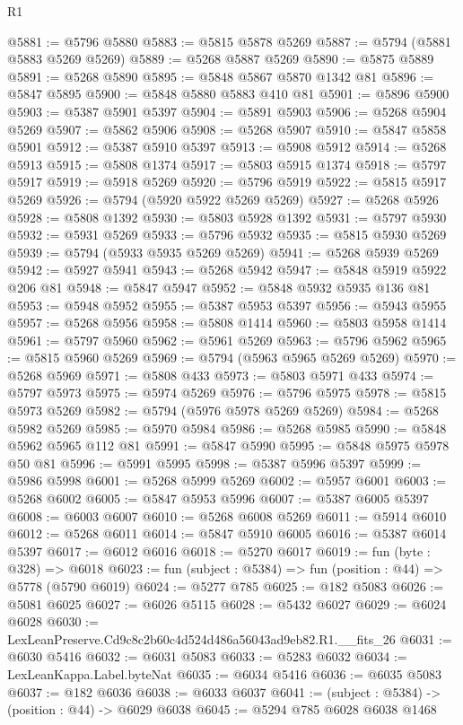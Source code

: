 \begin{lexlean}{R1}
\begin{coremodule}
@5881 := @5796 @5880
@5883 := @5815 @5878 @5269
@5887 := @5794 (@5881 @5883 @5269 @5269)
@5889 := @5268 @5887 @5269
@5890 := @5875 @5889
@5891 := @5268 @5890
@5895 := @5848 @5867 @5870 @1342 @81
@5896 := @5847 @5895
@5900 := @5848 @5880 @5883 @410 @81
@5901 := @5896 @5900
@5903 := @5387 @5901 @5397
@5904 := @5891 @5903
@5906 := @5268 @5904 @5269
@5907 := @5862 @5906
@5908 := @5268 @5907
@5910 := @5847 @5858 @5901
@5912 := @5387 @5910 @5397
@5913 := @5908 @5912
@5914 := @5268 @5913
@5915 := @5808 @1374
@5917 := @5803 @5915 @1374
@5918 := @5797 @5917
@5919 := @5918 @5269
@5920 := @5796 @5919
@5922 := @5815 @5917 @5269
@5926 := @5794 (@5920 @5922 @5269 @5269)
@5927 := @5268 @5926
@5928 := @5808 @1392
@5930 := @5803 @5928 @1392
@5931 := @5797 @5930
@5932 := @5931 @5269
@5933 := @5796 @5932
@5935 := @5815 @5930 @5269
@5939 := @5794 (@5933 @5935 @5269 @5269)
@5941 := @5268 @5939 @5269
@5942 := @5927 @5941
@5943 := @5268 @5942
@5947 := @5848 @5919 @5922 @206 @81
@5948 := @5847 @5947
@5952 := @5848 @5932 @5935 @136 @81
@5953 := @5948 @5952
@5955 := @5387 @5953 @5397
@5956 := @5943 @5955
@5957 := @5268 @5956
@5958 := @5808 @1414
@5960 := @5803 @5958 @1414
@5961 := @5797 @5960
@5962 := @5961 @5269
@5963 := @5796 @5962
@5965 := @5815 @5960 @5269
@5969 := @5794 (@5963 @5965 @5269 @5269)
@5970 := @5268 @5969
@5971 := @5808 @433
@5973 := @5803 @5971 @433
@5974 := @5797 @5973
@5975 := @5974 @5269
@5976 := @5796 @5975
@5978 := @5815 @5973 @5269
@5982 := @5794 (@5976 @5978 @5269 @5269)
@5984 := @5268 @5982 @5269
@5985 := @5970 @5984
@5986 := @5268 @5985
@5990 := @5848 @5962 @5965 @112 @81
@5991 := @5847 @5990
@5995 := @5848 @5975 @5978 @50 @81
@5996 := @5991 @5995
@5998 := @5387 @5996 @5397
@5999 := @5986 @5998
@6001 := @5268 @5999 @5269
@6002 := @5957 @6001
@6003 := @5268 @6002
@6005 := @5847 @5953 @5996
@6007 := @5387 @6005 @5397
@6008 := @6003 @6007
@6010 := @5268 @6008 @5269
@6011 := @5914 @6010
@6012 := @5268 @6011
@6014 := @5847 @5910 @6005
@6016 := @5387 @6014 @5397
@6017 := @6012 @6016
@6018 := @5270 @6017
@6019 := fun (byte : @328) => @6018
@6023 := fun (subject : @5384) => fun (position : @44) => @5778 (@5790 @6019)
@6024 := @5277 @785
@6025 := @182 @5083
@6026 := @5081 @6025
@6027 := @6026 @5115
@6028 := @5432 @6027
@6029 := @6024 @6028
@6030 := LexLeanPreserve.Cd9c8c2b60c4d524d486a56043ad9eb82.R1.__fits_26
@6031 := @6030 @5416
@6032 := @6031 @5083
@6033 := @5283 @6032
@6034 := LexLeanKappa.Label.byteNat
@6035 := @6034 @5416
@6036 := @6035 @5083
@6037 := @182 @6036
@6038 := @6033 @6037
@6041 := (subject : @5384) -> (position : @44) -> @6029 @6038
@6045 := @5294 @785 @6028 @6038 @1468

\end{coremodule}
\end{lexlean}
